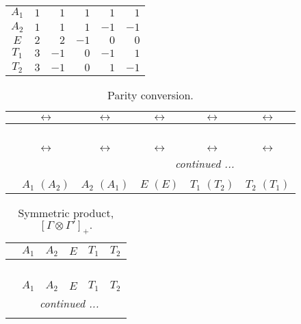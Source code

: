 \documentclass[fleqn,10pt,landscape]{article}
\begin{document}
\begin{itemize}
\begin{center}
\begin{longtable}{c|rrrrr}
$ A_{1} $ & $ 1 $ & $ 1 $ & $ 1 $ & $ 1 $ & $ 1 $ \\
$ A_{2} $ & $ 1 $ & $ 1 $ & $ 1 $ & $ -1 $ & $ -1 $ \\
$ E $ & $ 2 $ & $ 2 $ & $ -1 $ & $ 0 $ & $ 0 $ \\
$ T_{1} $ & $ 3 $ & $ -1 $ & $ 0 $ & $ -1 $ & $ 1 $ \\
$ T_{2} $ & $ 3 $ & $ -1 $ & $ 0 $ & $ 1 $ & $ -1 $ \\
\end{longtable}
\end{center}
\begin{center}
\renewcommand{\arraystretch}{1.0}
\begin{longtable}{cccccc}
\caption{Parity conversion.}
 \\
 \hline \hline
 & $\leftrightarrow$ & $\leftrightarrow$ & $\leftrightarrow$ & $\leftrightarrow$ & $\leftrightarrow$ \\ \hline \endfirsthead

\multicolumn{5}{l}{\tablename\ \thetable{}} \\
 \hline \hline
 & $\leftrightarrow$ & $\leftrightarrow$ & $\leftrightarrow$ & $\leftrightarrow$ & $\leftrightarrow$ \\ \hline \endhead

 \hline \hline
\multicolumn{5}{r}{\footnotesize\it continued ...} \\ \endfoot

 \hline \hline
\multicolumn{5}{r}{} \\ \endlastfoot

 & $ A_{1}\,\,(A_{2}) $ & $ A_{2}\,\,(A_{1}) $ & $ E\,\,(E) $ & $ T_{1}\,\,(T_{2}) $ & $ T_{2}\,\,(T_{1}) $ \\
\end{longtable}
\end{center}
\begin{center}
\renewcommand{\arraystretch}{1.0}
\begin{longtable}{c|ccccc}
\caption{Symmetric product, $[\Gamma\otimes\Gamma']_+.$}
 \\
 \hline \hline
 & $ A_{1} $ & $ A_{2} $ & $ E $ & $ T_{1} $ & $ T_{2} $ \\ \hline \endfirsthead

\multicolumn{5}{l}{\tablename\ \thetable{}} \\
 \hline \hline
 & $ A_{1} $ & $ A_{2} $ & $ E $ & $ T_{1} $ & $ T_{2} $ \\ \hline \endhead

 \hline \hline
\multicolumn{5}{r}{\footnotesize\it continued ...} \\ \endfoot


\end{longtable}
\end{center}
\end{itemize}
\end{document}
